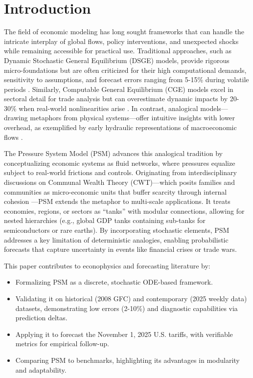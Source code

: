 \documentclass[11pt]{article}
\begin{document}
\section{Introduction}
The field of economic modeling has long sought frameworks that can handle the intricate interplay of global flows, policy interventions, and unexpected shocks while remaining accessible for practical use. Traditional approaches, such as Dynamic Stochastic General Equilibrium (DSGE) models, provide rigorous micro-foundations but are often criticized for their high computational demands, sensitivity to assumptions, and forecast errors ranging from 5-15\% during volatile periods \citep{christiano2018dsge, delnegro2013dsge, smets2007shocks, farmer2009virtues}. Similarly, Computable General Equilibrium (CGE) models excel in sectoral detail for trade analysis but can overestimate dynamic impacts by 20-30\% when real-world nonlinearities arise \citep{dixon2013validation, kehoe2005general, burfisher2017introduction}. In contrast, analogical models---drawing metaphors from physical systems---offer intuitive insights with lower overhead, as exemplified by early hydraulic representations of macroeconomic flows \citep{phillips1950mechanical, colander2008moniac, vines2000phillips, leijonhufvud2006uses}.

The Pressure System Model (PSM) advances this analogical tradition by conceptualizing economic systems as fluid networks, where pressures equalize subject to real-world frictions and controls. Originating from interdisciplinary discussions on Communal Wealth Theory (CWT)---which posits families and communities as micro-economic units that buffer scarcity through internal cohesion \citep{mcentire2025communal, lewis1966culture}---PSM extends the metaphor to multi-scale applications. It treats economies, regions, or sectors as ``tanks'' with modular connections, allowing for nested hierarchies (e.g., global GDP tanks containing sub-tanks for semiconductors or rare earths). By incorporating stochastic elements, PSM addresses a key limitation of deterministic analogies, enabling probabilistic forecasts that capture uncertainty in events like financial crises or trade wars.

This paper contributes to econophysics and forecasting literature by:
\begin{itemize}
\item Formalizing PSM as a discrete, stochastic ODE-based framework.
\item Validating it on historical (2008 GFC) and contemporary (2025 weekly data) datasets, demonstrating low errors (2-10\%) and diagnostic capabilities via prediction deltas.
\item Applying it to forecast the November 1, 2025 U.S. tariffs, with verifiable metrics for empirical follow-up.
\item Comparing PSM to benchmarks, highlighting its advantages in modularity and adaptability.
\end{itemize}
\end{document}
